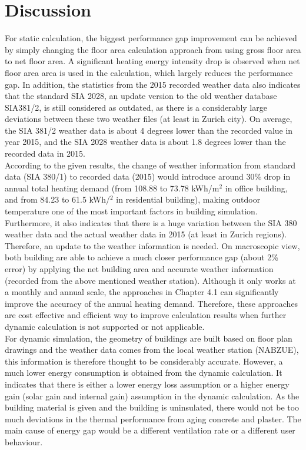 \documentclass[a4paper, oneside]{discothesis}
\begin{document}
\chapter{Discussion}
    
	
	For static calculation, the biggest performance gap improvement can be achieved by simply changing the floor area calculation approach from using gross floor area to net floor area. A significant heating energy intensity drop is observed when net floor area area is used in the calculation, which largely reduces the performance gap. In addition, the statistics from the 2015 recorded weather data also indicates that the standard SIA 2028, an update version to the old weather database SIA381/2, is still considered as outdated, as there is a considerably large deviations between these two weather files (at least in Zurich city). On average, the SIA 381/2 weather data is about 4 degrees lower than the recorded value in year 2015, and the SIA 2028 weather data is about 1.8 degrees lower than the recorded data in 2015.\\


	According to the given results, the change of weather information from standard data (SIA 380/1) to recorded data (2015) would introduce around 30\% drop in annual total heating demand (from 108.88 to 73.78 kWh/m$^2$ in office building, and from 84.23 to 61.5 kWh/$^2$ in residential building), making outdoor temperature one of the most important factors in building simulation. Furthermore, it also indicates that there is a huge variation between the SIA 380 weather data and the actual weather data in 2015 (at least in Zurich regions). Therefore, an update to the weather information is needed. On macroscopic view, both building are able to achieve a much closer performance gap (about 2\% error) by applying the net building area and accurate weather information (recorded from the above mentioned weather station). Although it only works at a monthly and annual scale, the approaches in Chapter 4.1 can significantly improve the accuracy of the annual heating demand. Therefore, these approaches are cost effective and efficient way to improve calculation results when further dynamic calculation is not supported or not applicable.\\

	For dynamic simulation, the geometry of buildings are built based on floor plan drawings and the weather data comes from the local weather station (NABZUE), this information is therefore thought to be considerably accurate. However, a much lower energy consumption is obtained from the dynamic calculation. It indicates that there is either a lower energy loss assumption or a higher energy gain (solar gain and internal gain) assumption in the dynamic calculation. As the building material is given and the building is uninsulated, there would not be too much deviations in the thermal performance from aging concrete and plaster. The main cause of energy gap would be a different ventilation rate or a different user behaviour. \\
\end{document}
